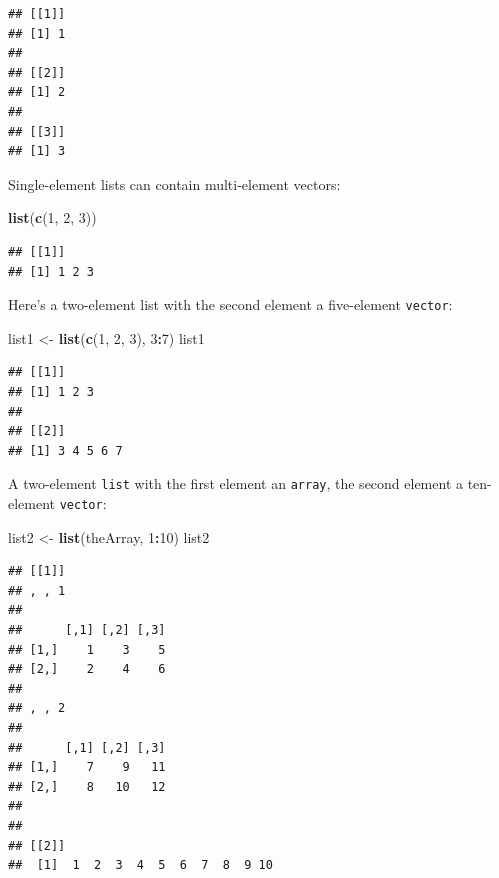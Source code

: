 \documentclass[]{book}
\newenvironment{Shaded}{\begin{snugshade}}{\end{snugshade}}
\newcommand{\DecValTok}[1]{\textcolor[rgb]{0.00,0.00,0.81}{#1}}
\newcommand{\KeywordTok}[1]{\textcolor[rgb]{0.13,0.29,0.53}{\textbf{#1}}}
\newcommand{\NormalTok}[1]{#1}
\newcommand{\OperatorTok}[1]{\textcolor[rgb]{0.81,0.36,0.00}{\textbf{#1}}}
\newcommand{\StringTok}[1]{\textcolor[rgb]{0.31,0.60,0.02}{#1}}
\theoremstyle{definition}
\theoremstyle{definition}
\theoremstyle{definition}
\theoremstyle{remark}
\begin{document}
\begin{verbatim}
## [[1]]
## [1] 1
## 
## [[2]]
## [1] 2
## 
## [[3]]
## [1] 3
\end{verbatim}

Single-element lists can contain multi-element vectors:

\begin{Shaded}
\begin{Highlighting}[]
\KeywordTok{list}\NormalTok{(}\KeywordTok{c}\NormalTok{(}\DecValTok{1}\NormalTok{, }\DecValTok{2}\NormalTok{, }\DecValTok{3}\NormalTok{))}
\end{Highlighting}
\end{Shaded}

\begin{verbatim}
## [[1]]
## [1] 1 2 3
\end{verbatim}

Here's a two-element list with the second element a five-element
\texttt{vector}:

\begin{Shaded}
\begin{Highlighting}[]
\NormalTok{list1 <-}\StringTok{ }\KeywordTok{list}\NormalTok{(}\KeywordTok{c}\NormalTok{(}\DecValTok{1}\NormalTok{, }\DecValTok{2}\NormalTok{, }\DecValTok{3}\NormalTok{), }\DecValTok{3}\OperatorTok{:}\DecValTok{7}\NormalTok{)}
\NormalTok{list1}
\end{Highlighting}
\end{Shaded}

\begin{verbatim}
## [[1]]
## [1] 1 2 3
## 
## [[2]]
## [1] 3 4 5 6 7
\end{verbatim}

A two-element \texttt{list} with the first element an \texttt{array},
the second element a ten-element \texttt{vector}:

\begin{Shaded}
\begin{Highlighting}[]
\NormalTok{list2 <-}\StringTok{ }\KeywordTok{list}\NormalTok{(theArray, }\DecValTok{1}\OperatorTok{:}\DecValTok{10}\NormalTok{)}
\NormalTok{list2}
\end{Highlighting}
\end{Shaded}

\begin{verbatim}
## [[1]]
## , , 1
## 
##      [,1] [,2] [,3]
## [1,]    1    3    5
## [2,]    2    4    6
## 
## , , 2
## 
##      [,1] [,2] [,3]
## [1,]    7    9   11
## [2,]    8   10   12
## 
## 
## [[2]]
##  [1]  1  2  3  4  5  6  7  8  9 10
\end{verbatim}
\end{document}
